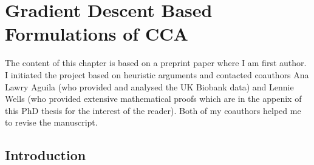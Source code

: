 \chapter{Gradient Descent Based Formulations of CCA}\label{ch:gradient_descent}
The content of this chapter is based on a preprint paper where I am first author.
I initiated the project based on heuristic arguments and contacted coauthors Ana Lawry Aguila (who provided and analysed the UK Biobank data) and Lennie Wells (who provided extensive mathematical proofs which are in the appenix of this PhD thesis for the interest of the reader).
Both of my coauthors helped me to revise the manuscript.
\minitoc
\section{Introduction}

